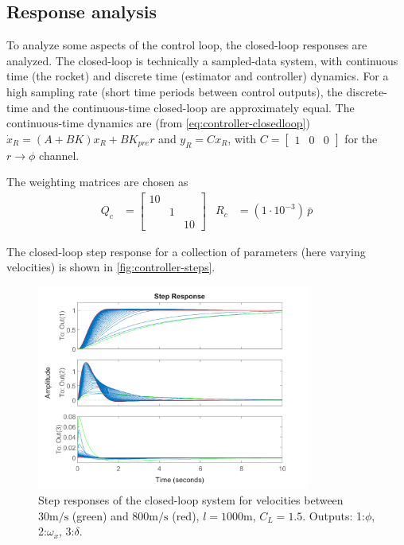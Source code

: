 \subsection{Response analysis}
To analyze some aspects of the control loop, the closed-loop responses are analyzed.
The closed-loop is technically a sampled-data system, with continuous time (the rocket) and discrete time (estimator and controller) dynamics.
For a high sampling rate (short time periods between control outputs), the discrete-time and the continuous-time closed-loop are approximately equal. 
The continuous-time dynamics are (from \autoref{eq:controller-closedloop})
$ \dot x_R = (A+BK) x_R + B K_{pre} r$ and $ y_R = C x_R $, with $C = \begin{bmatrix} 1 & 0 & 0 \end{bmatrix}$ for the $r \to \phi$ channel.

The weighting matrices are chosen as 
\begin{align}
    Q_c &= \begin{bmatrix}
        10 & & \\ & 1 & \\ & & 10  
        \end{bmatrix}
    &
    R_c &= (1 \cdot 10^{-3})\,  \bar p
\end{align}

The closed-loop step response for a collection of parameters (here varying velocities) is shown in \autoref{fig:controller-steps}.

\begin{figure}[ht!]
    \centering
    \includegraphics[width=0.8\textwidth]{images-design/controller_steps.png}
    \caption[Closed-loop step responses]{Step responses of the closed-loop system for velocities between $30\mathrm{m/s}$ (green) and $800\mathrm{m/s}$ (red), $l=1000\mathrm{m}$, $C_L = 1.5$. Outputs: 1:$\phi$, 2:$\omega_x$, 3:$\delta$.}
    \label{fig:controller-steps}
\end{figure}

